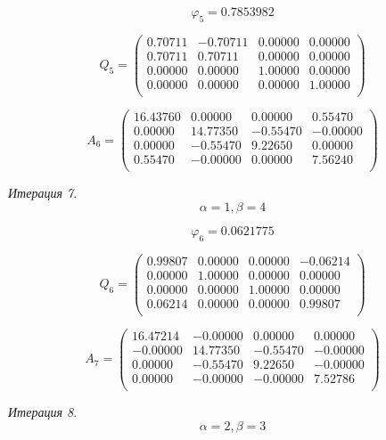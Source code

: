 \documentclass[14pt,a4paper]{scrartcl}
\begin{document}
$$\varphi_5 = 0.7853982 $$

$$ Q_5 =
\begin{pmatrix}
0.70711 & -0.70711 & 0.00000 & 0.00000 \\ 
0.70711 & 0.70711 & 0.00000 & 0.00000 \\ 
0.00000 & 0.00000 & 1.00000 & 0.00000 \\ 
0.00000 & 0.00000 & 0.00000 & 1.00000 \\ 
\end{pmatrix}
$$

$$
A_6 = 
\begin{pmatrix}
16.43760 & 0.00000 & 0.00000 & 0.55470 \\ 
0.00000 & 14.77350 & -0.55470 & -0.00000 \\ 
0.00000 & -0.55470 & 9.22650 & 0.00000 \\ 
0.55470 & -0.00000 & 0.00000 & 7.56240 \\ 
\end{pmatrix}
$$




\textit{Итерация 7.}\\
$$\alpha = 1, \beta = 4$$

$$\varphi_6 = 0.0621775 $$

$$ Q_6 =
\begin{pmatrix}
0.99807 & 0.00000 & 0.00000 & -0.06214 \\ 
0.00000 & 1.00000 & 0.00000 & 0.00000 \\ 
0.00000 & 0.00000 & 1.00000 & 0.00000 \\ 
0.06214 & 0.00000 & 0.00000 & 0.99807 \\ 
\end{pmatrix}
$$

$$
A_7 = 
\begin{pmatrix}
16.47214 & -0.00000 & 0.00000 & 0.00000 \\ 
-0.00000 & 14.77350 & -0.55470 & -0.00000 \\ 
0.00000 & -0.55470 & 9.22650 & -0.00000 \\ 
0.00000 & -0.00000 & -0.00000 & 7.52786 \\ 
\end{pmatrix}
$$




\textit{Итерация 8.}\\
$$\alpha = 2, \beta = 3$$
\end{document}
